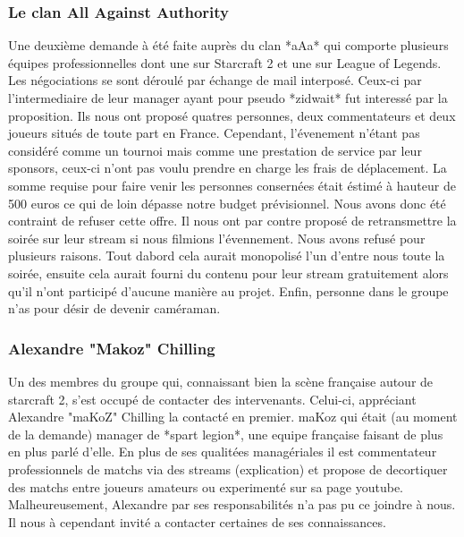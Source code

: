 \subsubsection{Le clan All Against Authority}%
\label{ssub:le_clan_all_against_authority}

Une deuxième demande à été faite auprès du clan *aAa* qui comporte
plusieurs équipes professionnelles dont une sur Starcraft 2 et une sur
League of Legends. Les négociations se sont déroulé par échange de mail
interposé.  Ceux-ci par l'intermediaire de leur manager ayant pour
pseudo *zidwait* fut interessé par la proposition. Ils nous ont proposé
quatres personnes, deux commentateurs et deux joueurs situés de toute
part en France. Cependant, l'évenement n'étant pas considéré comme un
tournoi mais comme une prestation de service par leur sponsors, ceux-ci
n'ont pas voulu prendre en charge les frais de déplacement. La somme
requise pour faire venir les personnes consernées était éstimé à hauteur
de 500 euros ce qui de loin dépasse notre budget prévisionnel. Nous
avons donc été contraint de refuser cette offre. Il nous ont par contre
proposé de retransmettre la soirée sur leur stream si nous filmions
l'évennement. Nous avons refusé pour plusieurs raisons. Tout dabord cela
aurait monopolisé l'un d'entre nous toute la soirée, ensuite cela aurait
fourni du contenu pour leur stream gratuitement alors qu'il n'ont
participé d'aucune manière au projet. Enfin, personne dans le groupe
n'as pour désir de devenir caméraman.

\subsubsection{Alexandre "Makoz" Chilling}%
\label{ssub:alexandre_makoz_chilling}

Un des membres du groupe qui, connaissant bien la scène française autour
de starcraft 2, s'est occupé de contacter des intervenants.  Celui-ci,
appréciant Alexandre "maKoZ" Chilling la contacté en premier.  maKoz qui
était (au moment de la demande) manager de *spart legion*, une equipe
française faisant de plus en plus parlé d'elle. En plus de ses qualitées
managériales il est commentateur professionnels de matchs via des
streams (explication) et propose de decortiquer des matchs entre joueurs
amateurs ou experimenté sur sa page youtube. Malheureusement, Alexandre
par ses responsabilités n'a pas pu ce joindre à nous. Il nous à
cependant invité a contacter certaines de ses connaissances.

